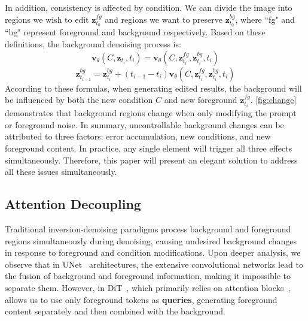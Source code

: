 In addition, consistency is affected by condition. We can divide the image into regions we wish to edit $\mathbf{z}_{t_0}^{fg}$ and regions we want to preserve $\mathbf{z}_{t_0}^{bg}$, where ``fg" and ``bg" represent foreground and background respectively. Based on these definitions, the background denoising process is:
\begin{equation}
\boldsymbol{v}_\theta(C,\mathbf{z}_{t_i},t_i)=\boldsymbol{v}_\theta(C,\mathbf{z}_{t_i}^{fg},\mathbf{z}_{t_i}^{bg},t_i)
\end{equation}
\begin{equation}
\mathbf{z}_{t_{i-1}}^{bg}=\mathbf{z}_{t_i}^{bg}+(t_{i-1}-t_i)\boldsymbol{v}_\theta(C,\mathbf{z}_{t_i}^{fg},\mathbf{z}_{t_i}^{bg},t_i) 
\end{equation}
According to these formulas, when generating edited results, the background will be influenced by both the new condition $C$ and new foreground $\mathbf{z}_{t_i}^{fg}$. \cref{fig:change} demonstrates that background regions change when only modifying the prompt or foreground noise. In summary, uncontrollable background changes can be attributed to three factors: error accumulation, new conditions, and new foreground content. In practice, any single element will trigger all three effects simultaneously. Therefore, this paper will present an elegant solution to address all these issues simultaneously.


\subsection{Attention Decoupling}
Traditional inversion-denoising paradigms process background and foreground regions simultaneously during denoising, causing undesired background changes in response to foreground and condition modifications. Upon deeper analysis, we observe that in UNet~\cite{ronneberger2015u} architectures, the extensive convolutional networks lead to the fusion of background and foreground information, making it impossible to separate them. However, in DiT~\cite{peebles2023scalable}, which primarily relies on attention blocks~\cite{vaswani2017attention}, allows us to use only foreground tokens as \textbf{queries}, generating foreground content separately and then combined with the background.

